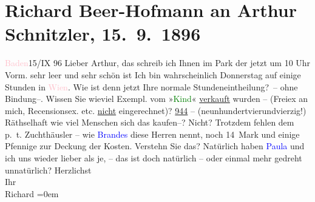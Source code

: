 

               \section[Richard Beer-Hofmann an Arthur Schnitzler, 15. 9. 1896]{ Richard Beer-Hofmann an Arthur Schnitzler,
               15. 9. 1896}\nopagebreak{}\rehead{ }\normalsize\beginnumbering{} \toendnotes[C]{\smallbreak\pagebreak[2]} 
\pstart
           {\pb}\textcolor{pink}{Baden}{}\ledrightnote{\textcolor{pink}{Baden bei Wien}}{ }15/IX 96\pend
           \pstart
           Lieber Arthur, das schreib ich Ihnen im Park der jetzt um 10
                  Uhr Vorm.
                sehr leer und sehr schön ist\pend
           \pstart
           Ich bin wahrscheinlich Donnerstag auf einige Stunden in \textcolor{pink}{Wien}{}\ledrightnote{\textcolor{pink}{Wien}}. Wie ist denn jetzt Ihre normale Stundeneintheilung? – ohne
                  {\pb}Bindung–. Wissen Sie wieviel
               Exempl. vom »\textcolor{green}{Kind}{}\ledrightnote{\textcolor{green}{Das Kind}}« \uline{verkauft} wurden – (Freiex an mich, Recensionsex. etc. \uline{nicht} eingerechnet)?\pend
           \pstart
           \uline{944} – (neunhundertvierundvierzig!) Räthselhaft wie
               viel Menschen sich das kaufen–? Nicht? Trotzdem {\pb}fehlen dem p. t. Zuchthäusler
               – wie \textcolor{blue}{Brandes}{}\ledrightnote{\textcolor{blue}{Georg Brandes}} diese Herren nennt, noch 14 Mark
               und einige Pfennige zur Deckung der Kosten. Verstehn Sie das?\pend
           \pstart
           Natürlich haben \textcolor{blue}{Paula}{}\ledrightnote{\textcolor{blue}{Paula Beer-Hofmann}} und ich uns wieder
               lieber als {\pb}je, – das ist doch
               natürlich – oder  einmal mehr gedreht
               unnatürlich?\pend
           \pstart
           Herzlichst{\\[\baselineskip]}Ihr{\\[\baselineskip]}\spacefill\mbox{Richard}\pend
           \leftskip=0em{}\endnumbering{}  
      